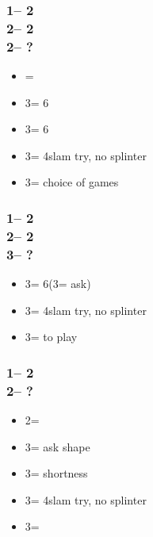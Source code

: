 \documentclass[12pt, a4paper]{report}
\begin{document}
{{        \subsubsection*{1\nt -- 2\clubs\\
                        2\hearts -- 2\spades\\
                        2\nt -- ?}
        \begin{itemize}
            \item \pass = \inv\ \bal
            \item 3\clubs = 6\spades\ \inv
            \item 3\diams = 6\spades\ \inv
            \item 3\hearts = 4\hearts slam try, no splinter
            \item 3\nt = choice of games
        \end{itemize}

        \subsubsection*{1\nt -- 2\clubs\\
                        2\hearts -- 2\spades\\
                        3\clubs -- ?}
        \begin{itemize}
            \item 3\diams = 6\spades (3\hearts = ask)
            \item 3\hearts = 4\hearts slam try, no splinter
            \item 3\nt = to play
        \end{itemize}

        \subsubsection*{1\nt -- 2\clubs\\
                        2\spades -- ?}
        \begin{itemize}
            \item 2\nt = \inv
            \item 3\clubs = ask shape
            \item 3\diams = \minor shortness
            \item 3\hearts = 4\spades slam try, no splinter
            \item 3\spades = \inv
        \end{itemize}

}}
\end{document}
